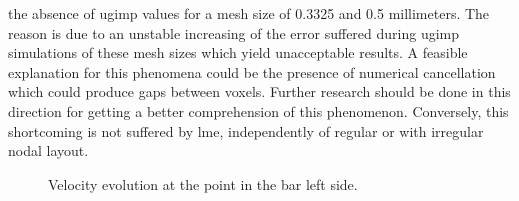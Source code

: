 \documentclass[preprint,12pt,a4paper]{elsarticle}
\begin{document}
the absence of \acrshort{ugimp} values for a mesh size of 0.3325 and 0.5
millimeters. The reason is due to an unstable
increasing of the error suffered during \acrshort{ugimp} simulations of these mesh sizes which yield unacceptable results. A feasible
explanation for this phenomena could be the presence of numerical
cancellation which could produce gaps between voxels. Further research
should be done in this direction for getting a better comprehension of
this phenomenon. Conversely, this shortcoming is not suffered by \acrshort{lme}, independently of regular or with irregular nodal layout.
\begin{figure}\sidecaption
  \centering
  \caption{Velocity evolution at the point in the bar left side.}
  \label{fig:Dyka-uGIMP-LME}
\end{figure}
\end{document}
